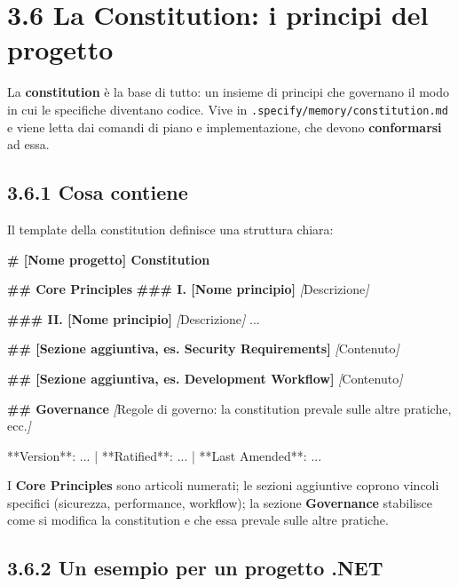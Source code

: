 \documentclass[
  italian,
  10pt,
]{book}
\newenvironment{Shaded}{\begin{snugshade}}{\end{snugshade}}
\newcommand{\CommentTok}[1]{\textcolor[rgb]{0.56,0.35,0.01}{\textit{#1}}}
\newcommand{\FunctionTok}[1]{\textcolor[rgb]{0.13,0.29,0.53}{\textbf{#1}}}
\newcommand{\NormalTok}[1]{#1}
\newcommand{\OtherTok}[1]{\textcolor[rgb]{0.56,0.35,0.01}{#1}}
\begin{document}
\section{3.6 La Constitution: i principi del
progetto}\label{la-constitution-i-principi-del-progetto}

La \textbf{constitution} è la base di tutto: un insieme di principi che
governano il modo in cui le specifiche diventano codice. Vive in
\texttt{.specify/memory/constitution.md} e viene letta dai comandi di
piano e implementazione, che devono \textbf{conformarsi} ad essa.

\subsection{3.6.1 Cosa contiene}\label{cosa-contiene}

Il template della constitution definisce una struttura chiara:

\begin{Shaded}
\begin{Highlighting}[]
\FunctionTok{\# [Nome progetto] Constitution}

\FunctionTok{\#\# Core Principles}
\FunctionTok{\#\#\# I. [Nome principio]}
\CommentTok{[}\OtherTok{Descrizione}\CommentTok{]}

\FunctionTok{\#\#\# II. [Nome principio]}
\CommentTok{[}\OtherTok{Descrizione}\CommentTok{]}
\NormalTok{...}

\FunctionTok{\#\# [Sezione aggiuntiva, es. Security Requirements]}
\CommentTok{[}\OtherTok{Contenuto}\CommentTok{]}

\FunctionTok{\#\# [Sezione aggiuntiva, es. Development Workflow]}
\CommentTok{[}\OtherTok{Contenuto}\CommentTok{]}

\FunctionTok{\#\# Governance}
\CommentTok{[}\OtherTok{Regole di governo: la constitution prevale sulle altre pratiche, ecc.}\CommentTok{]}

\NormalTok{**Version**: ... | **Ratified**: ... | **Last Amended**: ...}
\end{Highlighting}
\end{Shaded}

I \textbf{Core Principles} sono articoli numerati; le sezioni aggiuntive
coprono vincoli specifici (sicurezza, performance, workflow); la sezione
\textbf{Governance} stabilisce come si modifica la constitution e che
essa prevale sulle altre pratiche.

\subsection{3.6.2 Un esempio per un progetto
.NET}\label{un-esempio-per-un-progetto-.net}
\end{document}
